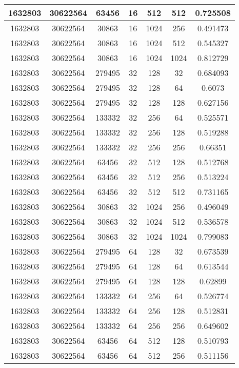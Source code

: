 \documentclass[9pt]{article}
\begin{document}
\begin{tabular}{|c|c|c|c|c|c|c| }
\hline
1632803  & 30622564  & 63456  & 16  & 512  & 512  & 0.725508 \\
\hline
1632803  & 30622564  & 30863  & 16  & 1024  & 256  & 0.491473 \\
\hline
1632803  & 30622564  & 30863  & 16  & 1024  & 512  & 0.545327 \\
\hline
1632803  & 30622564  & 30863  & 16  & 1024  & 1024  & 0.812729 \\
\hline
1632803  & 30622564  & 279495  & 32  & 128  & 32  & 0.684093 \\
\hline
1632803  & 30622564  & 279495  & 32  & 128  & 64  & 0.6073 \\
\hline
1632803  & 30622564  & 279495  & 32  & 128  & 128  & 0.627156 \\
\hline
1632803  & 30622564  & 133332  & 32  & 256  & 64  & 0.525571 \\
\hline
1632803  & 30622564  & 133332  & 32  & 256  & 128  & 0.519288 \\
\hline
1632803  & 30622564  & 133332  & 32  & 256  & 256  & 0.66351 \\
\hline
1632803  & 30622564  & 63456  & 32  & 512  & 128  & 0.512768 \\
\hline
1632803  & 30622564  & 63456  & 32  & 512  & 256  & 0.513224 \\
\hline
1632803  & 30622564  & 63456  & 32  & 512  & 512  & 0.731165 \\
\hline
1632803  & 30622564  & 30863  & 32  & 1024  & 256  & 0.496049 \\
\hline
1632803  & 30622564  & 30863  & 32  & 1024  & 512  & 0.536578 \\
\hline
1632803  & 30622564  & 30863  & 32  & 1024  & 1024  & 0.799083 \\
\hline
1632803  & 30622564  & 279495  & 64  & 128  & 32  & 0.673539 \\
\hline
1632803  & 30622564  & 279495  & 64  & 128  & 64  & 0.613544 \\
\hline
1632803  & 30622564  & 279495  & 64  & 128  & 128  & 0.62899 \\
\hline
1632803  & 30622564  & 133332  & 64  & 256  & 64  & 0.526774 \\
\hline
1632803  & 30622564  & 133332  & 64  & 256  & 128  & 0.512831 \\
\hline
1632803  & 30622564  & 133332  & 64  & 256  & 256  & 0.649602 \\
\hline
1632803  & 30622564  & 63456  & 64  & 512  & 128  & 0.510793 \\
\hline
1632803  & 30622564  & 63456  & 64  & 512  & 256  & 0.511156 \\

\end{tabular}
\end{document}
